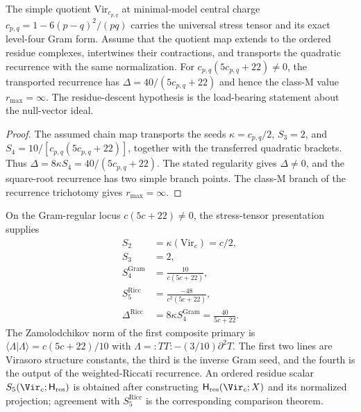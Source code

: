 \begin{proposition}
\label{prop:minimal-model-class-transport}
\ClaimStatusConditional
The simple quotient $\mathrm{Vir}_{c_{p,q}}$ at minimal-model central
charge $c_{p,q} = 1 - 6(p-q)^{2}/(pq)$ carries the universal stress
tensor and its exact level-four Gram form.  Assume that the quotient map
extends to the ordered residue complexes, intertwines their contractions,
and transports the quadratic recurrence with the same normalization.
For $c_{p,q}(5c_{p,q}+22)\ne0$, the transported recurrence has
$\Delta=40/(5c_{p,q}+22)$ and hence the class-M value
$r_{\max}=\infty$.  The residue-descent hypothesis is the load-bearing
statement about the null-vector ideal.
\end{proposition}

\begin{proof}
The assumed chain map transports the seeds
$\kappa=c_{p,q}/2$, $S_3=2$, and
$S_4=10/[c_{p,q}(5c_{p,q}+22)]$, together with the transferred
quadratic brackets.  Thus
$\Delta=8\kappa S_4=40/(5c_{p,q}+22)$.  The stated regularity gives
$\Delta\ne0$, and the square-root recurrence has two simple branch
points.  The class-M branch of the recurrence trichotomy gives
$r_{\max}=\infty$.
\end{proof}

\begin{proposition}
\label{prop:virasoro-shadow-canonical}
\ClaimStatusConditional
On the Gram-regular locus $c(5c+22)\ne0$, the stress-tensor
presentation supplies
\begin{align*}
S_2 &= \kappa(\mathrm{Vir}_c) = c/2, \\
S_3 &= 2, \\
S_4^{\mathrm{Gram}} &= \frac{10}{c(5c+22)}, \\
S_5^{\mathrm{Ricc}} &= \frac{-48}{c^2(5c+22)}, \\
\Delta^{\mathrm{Ricc}} &= 8\kappa S_4^{\mathrm{Gram}}
= \frac{40}{5c+22}.
\end{align*}
The Zamolodchikov norm of the first composite primary is
$\langle\Lambda | \Lambda\rangle = c(5c+22)/10$ with
$\Lambda = {:}TT{:} - (3/10)\partial^2 T$.  The first two lines are
Virasoro structure constants, the third is the inverse Gram seed, and
the fourth is the output of the weighted-Riccati recurrence.  An ordered
residue scalar $S_5(\Vir_c;\mathsf H_{\mathrm{res}})$ is obtained after
constructing $\mathsf H_{\mathrm{res}}(\Vir_c;X)$ and its normalized
projection; agreement with $S_5^{\mathrm{Ricc}}$ is the corresponding
comparison theorem.
\end{proposition}

